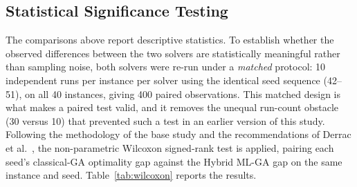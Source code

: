 \documentclass[conference]{IEEEtran}
\begin{document}
\subsection{Statistical Significance Testing}

The comparisons above report descriptive statistics. To establish whether the
observed differences between the two solvers are statistically meaningful
rather than sampling noise, both solvers were re-run under a \emph{matched}
protocol: 10 independent runs per instance per solver using the identical seed
sequence (42--51), on all 40 instances, giving 400 paired observations. This
matched design is what makes a paired test valid, and it removes the unequal
run-count obstacle (30 versus 10) that prevented such a test in an earlier
version of this study. Following the methodology of the base study
\citep{ozsoydan2023} and the recommendations of Derrac et al.\
\citep{derrac2011}, the non-parametric Wilcoxon signed-rank test is applied,
pairing each seed's classical-GA optimality gap against the Hybrid ML-GA gap
on the same instance and seed. Table~\ref{tab:wilcoxon} reports the results.

\begin{table}[t]
\centering
\caption{Wilcoxon signed-rank test on paired per-seed optimality gaps (10 matched seeds per instance, classical GA vs.\ Hybrid ML-GA).}
\label{tab:wilcoxon}
\end{table}
\end{document}
